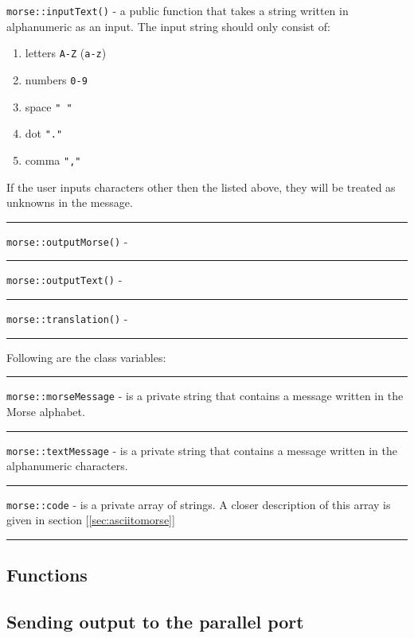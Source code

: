 \documentclass[12pt]{report}
\begin{document}
\verb|morse::inputText()| - a public function that takes a string written in alphanumeric as an input. The input string should only consist of:

\begin{enumerate}
\item letters \verb|A-Z| (\verb|a-z|)
\item numbers \verb|0-9|
\item space \verb|" "|
\item dot \verb|"."|
\item comma \verb|","|
\end{enumerate}

If the user inputs characters other then the listed above, they will be treated as unknowns in the message.

\rule{\textwidth}{0.5pt}

\verb|morse::outputMorse()| - 

\rule{\textwidth}{0.5pt}

\verb|morse::outputText()| - 

\rule{\textwidth}{0.5pt}

\verb|morse::translation()| - 

\rule{\textwidth}{0.5pt}



Following are the class variables:

\rule{\textwidth}{0.5pt}

\verb|morse::morseMessage| - is a private string that contains a message written in the Morse alphabet.

\rule{\textwidth}{0.5pt}

\verb|morse::textMessage| - is a private string that contains a message written in the alphanumeric characters.

\rule{\textwidth}{0.5pt}

\verb|morse::code| - is a private array of strings. A closer description of this array is given in section [\ref{sec:asciitomorse}]

\rule{\textwidth}{0.5pt}

\subsection{Functions}










\subsection{Sending output to the parallel port}
\end{document}
